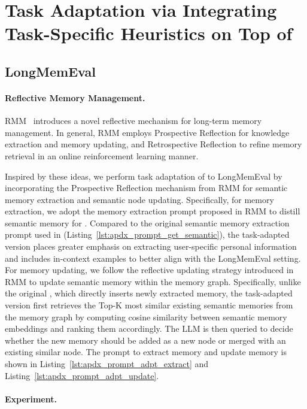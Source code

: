 \section{Task Adaptation via Integrating Task-Specific Heuristics on Top of \plugmem}
\label{app:task_adaptation}
\subsection{LongMemEval}
\paragraph{Reflective Memory Management.}

RMM~\cite{tan2025prospectretrospectreflectivememory} introduces a novel reflective mechanism for long-term memory management. In general, RMM employs Prospective Reflection for knowledge extraction and memory updating, and Retrospective Reflection to refine memory retrieval in an online reinforcement learning manner.



Inspired by these ideas, we perform task adaptation of \plugmem to LongMemEval by incorporating the Prospective Reflection mechanism from RMM for semantic memory extraction and semantic node updating. Specifically, for memory extraction, we adopt the memory extraction prompt proposed in RMM to distill semantic memory for \plugmem. Compared to the original semantic memory extraction prompt used in \plugmem (Listing~\ref{lst:apdx_prompt_get_semantic}), the task-adapted version places greater emphasis on extracting user-specific personal information and includes in-context examples to better align with the LongMemEval setting. For memory updating, we follow the reflective updating strategy introduced in RMM to update semantic memory within the memory graph. Specifically, unlike the original \plugmem, which directly inserts newly extracted memory, the task-adapted version first retrieves the Top-K most similar existing semantic memories from the memory graph by computing cosine similarity between semantic memory embeddings and ranking them accordingly. The LLM is then queried to decide whether the new memory should be added as a new node or merged with an existing similar node. The prompt to extract memory and update memory is shown in Listing~\ref{lst:apdx_prompt_adpt_extract} and Listing~\ref{lst:apdx_prompt_adpt_update}.

\paragraph{Experiment.}

